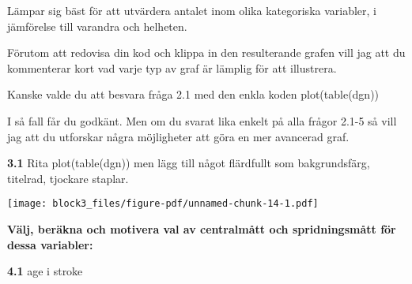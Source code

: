 \documentclass[
  letterpaper,
  DIV=11,
  numbers=noendperiod]{scrartcl}
\newenvironment{Shaded}{\begin{snugshade}}{\end{snugshade}}
\newcommand{\AttributeTok}[1]{\textcolor[rgb]{0.40,0.45,0.13}{#1}}
\newcommand{\CommentTok}[1]{\textcolor[rgb]{0.37,0.37,0.37}{#1}}
\newcommand{\FloatTok}[1]{\textcolor[rgb]{0.68,0.00,0.00}{#1}}
\newcommand{\FunctionTok}[1]{\textcolor[rgb]{0.28,0.35,0.67}{#1}}
\newcommand{\NormalTok}[1]{\textcolor[rgb]{0.00,0.23,0.31}{#1}}
\newcommand{\OtherTok}[1]{\textcolor[rgb]{0.00,0.23,0.31}{#1}}
\newcommand{\SpecialCharTok}[1]{\textcolor[rgb]{0.37,0.37,0.37}{#1}}
\newcommand{\StringTok}[1]{\textcolor[rgb]{0.13,0.47,0.30}{#1}}
\begin{document}
Lämpar sig bäst för att utvärdera antalet inom olika kategoriska
variabler, i jämförelse till varandra och helheten.

Förutom att redovisa din kod och klippa in den resulterande grafen vill
jag att du kommenterar kort vad varje typ av graf är lämplig för att
illustrera.

Kanske valde du att besvara fråga 2.1 med den enkla koden
plot(table(dgn))

I så fall får du godkänt. Men om du svarat lika enkelt på alla frågor
2.1-5 så vill jag att du utforskar några möjligheter att göra en mer
avancerad graf.

\textbf{3.1} Rita plot(table(dgn)) men lägg till något flärdfullt som
bakgrundsfärg, titelrad, tjockare staplar.

\begin{Shaded}
\end{Shaded}

\texttt{[image: block3\_files/figure-pdf/unnamed-chunk-14-1.pdf]}

\textbf{Välj, beräkna och motivera val av centralmått och spridningsmått
för dessa variabler:}

\textbf{4.1} age i stroke

\begin{Shaded}
\end{Shaded}
\end{document}
